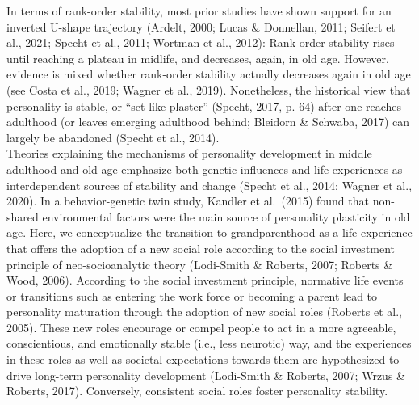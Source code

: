 \documentclass[
  english,
  man, noextraspace]{apa7}
\begin{document}
In terms of rank-order stability, most prior studies have shown support for an inverted U-shape trajectory (Ardelt, 2000; Lucas \& Donnellan, 2011; Seifert et al., 2021; Specht et al., 2011; Wortman et al., 2012): Rank-order stability rises until reaching a plateau in midlife, and decreases, again, in old age. However, evidence is mixed whether rank-order stability actually decreases again in old age (see Costa et al., 2019; Wagner et al., 2019). Nonetheless, the historical view that personality is stable, or \enquote{set like plaster} (Specht, 2017, p. 64) after one reaches adulthood (or leaves emerging adulthood behind; Bleidorn \& Schwaba, 2017) can largely be abandoned (Specht et al., 2014).\\
Theories explaining the mechanisms of personality development in middle adulthood and old age emphasize both genetic influences and life experiences as interdependent sources of stability and change (Specht et al., 2014; Wagner et al., 2020). In a behavior-genetic twin study, Kandler et al.~(2015) found that non-shared environmental factors were the main source of personality plasticity in old age. Here, we conceptualize the transition to grandparenthood as a life experience that offers the adoption of a new social role according to the social investment principle of neo-socioanalytic theory (Lodi-Smith \& Roberts, 2007; Roberts \& Wood, 2006). According to the social investment principle, normative life events or transitions such as entering the work force or becoming a parent lead to personality maturation through the adoption of new social roles (Roberts et al., 2005). These new roles encourage or compel people to act in a more agreeable, conscientious, and emotionally stable (i.e., less neurotic) way, and the experiences in these roles as well as societal expectations towards them are hypothesized to drive long-term personality development (Lodi-Smith \& Roberts, 2007; Wrzus \& Roberts, 2017). Conversely, consistent social roles foster personality stability.\\
\end{document}
